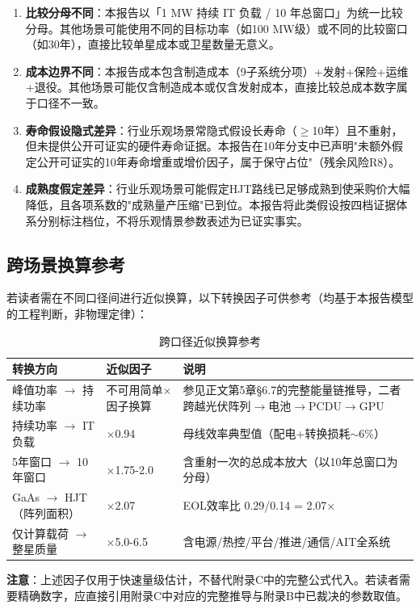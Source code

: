 \begin{enumerate}
  \item \textbf{比较分母不同}：本报告以「1 MW 持续 IT 负载 / 10 年总窗口」为统一比较分母。其他场景可能使用不同的目标功率（如100 MW级）或不同的比较窗口（如30年），直接比较单星成本或卫星数量无意义。

  \item \textbf{成本边界不同}：本报告成本包含制造成本（9子系统分项）+发射+保险+运维+退役。其他场景可能仅含制造成本或仅含发射成本，直接比较总成本数字属于口径不一致。

  \item \textbf{寿命假设隐式差异}：行业乐观场景常隐式假设长寿命（$\ge$10年）且不重射，但未提供公开可证实的硬件寿命证据。本报告在10年分支中已声明"未额外假定公开可证实的10年寿命增重或增价因子，属于保守占位"（残余风险R8）。

  \item \textbf{成熟度假定差异}：行业乐观场景可能假定HJT路线已足够成熟到使采购价大幅降低，且各项系数的"成熟量产压缩"已到位。本报告将此类假设按四档证据体系分别标注档位，不将乐观情景参数表述为已证实事实。
\end{enumerate}

\subsection{跨场景换算参考}

若读者需在不同口径间进行近似换算，以下转换因子可供参考（均基于本报告模型的工程判断，非物理定律）：

\begin{table}[H]
  \centering
  \caption{跨口径近似换算参考}
  \label{tab:cross-alignment-conversion}
  \begin{tabularx}{\textwidth}{
    >{\raggedright\arraybackslash}p{2.9cm}
    >{\centering\arraybackslash}p{1.8cm}
    >{\raggedright\arraybackslash}X
  }
  \toprule
  \textbf{转换方向} & \textbf{近似因子} & \textbf{说明} \\
  \midrule
  峰值功率 $\to$ 持续功率 & 不可用简单$\times$因子换算 & 参见正文第5章§6.7的完整能量链推导，二者跨越光伏阵列$\to$电池$\to$PCDU$\to$GPU \\
持续功率 $\to$ IT负载 & $\times$0.94 & 母线效率典型值（配电+转换损耗$\sim$6\%） \\
  5年窗口 $\to$ 10年窗口 & $\times$1.75-2.0 & 含重射一次的总成本放大（以10年总窗口为分母） \\
  GaAs $\to$ HJT（阵列面积） & $\times$2.07 & EOL效率比 0.29/0.14 = 2.07$\times$ \\
  仅计算载荷 $\to$ 整星质量 & $\times$5.0-6.5 & 含电源/热控/平台/推进/通信/AIT全系统 \\
  \bottomrule
  \end{tabularx}
\end{table}

\textbf{注意}：上述因子仅用于快速量级估计，不替代附录C中的完整公式代入。若读者需要精确数字，应直接引用附录C中对应的完整推导与附录B中已裁决的参数取值。
